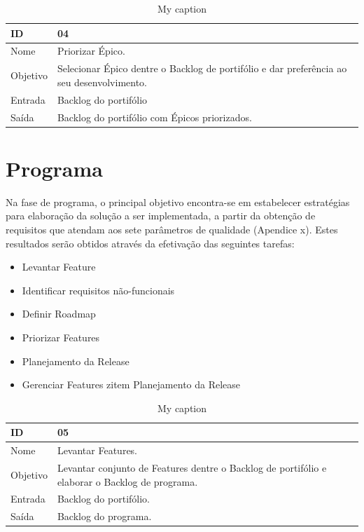 \begin{table}[\htp]
\centering
\caption{My caption}
\label{my-label}
\begin{tabular}{|l|l|}
\hline
ID       & 04                                                \\ \hline
Nome     & Priorizar Épico. \\ \hline
Objetivo & Selecionar Épico dentre o Backlog de portifólio e dar preferência ao seu desenvolvimento.
 \\ \hline
Entrada  &  Backlog do portifólio \\ \hline
Saída    & Backlog do portifólio com Épicos priorizados. \\ \hline
\end{tabular}
\end{table}

\section{Programa}

Na fase de programa, o principal objetivo encontra-se em estabelecer estratégias para elaboração da solução a ser implementada, a partir da obtenção de requisitos que atendam aos sete parâmetros de qualidade (Apendice x). Estes resultados serão obtidos através da efetivação das seguintes tarefas:

\begin{itemize}
\item Levantar Feature
\item Identificar requisitos não-funcionais
\item Definir Roadmap
\item Priorizar Features
\item Planejamento da Release
\item Gerenciar Features
zitem Planejamento da Release
\end{itemize}

\begin{table}[\htp]
\centering
\caption{My caption}
\label{my-label}
\begin{tabular}{|l|l|}
\hline
ID       & 05                                               \\ \hline
Nome     & Levantar Features. \\ \hline
Objetivo & Levantar conjunto de Features dentre o Backlog de portifólio e elaborar o Backlog de programa.
 \\ \hline
Entrada  &  Backlog do portifólio. \\ \hline
Saída    & Backlog do programa. \\ \hline
\end{tabular}
\end{table}

